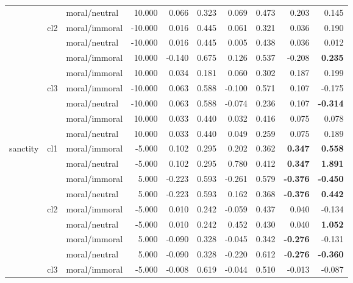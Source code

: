 \documentclass[runninghheads]{llncs}
\begin{document}
\begin{table}[!ht]
\begin{tabular}{|l|l|l|r|r|r|r|r|r|r|}
         &  & moral/neutral & 10.000 & 0.066 & 0.323 & 0.069 & 0.473 & 0.203 & 0.145 \\ 
          \cline{2-10}
         & \multirow{4}{*}{cl2} & moral/immoral & -10.000 & 0.016 & 0.445 & 0.061 & 0.321 & 0.036 & 0.190 \\ 
         &  & moral/neutral & -10.000 & 0.016 & 0.445 & 0.005 & 0.438 & 0.036 & 0.012 \\ 
         &  & moral/immoral & 10.000 & -0.140 & 0.675 & 0.126 & 0.537 & -0.208 & \textbf{0.235} \\ 
         &  & moral/immoral & 10.000 & 0.034 & 0.181 & 0.060 & 0.302 & 0.187 & 0.199 \\ 
          \cline{2-10}
         & \multirow{4}{*}{cl3} & moral/immoral & -10.000 & 0.063 & 0.588 & -0.100 & 0.571 & 0.107 & -0.175 \\ 
         &  & moral/neutral & -10.000 & 0.063 & 0.588 & -0.074 & 0.236 & 0.107 & \textbf{-0.314} \\
         &  & moral/immoral & 10.000 & 0.033 & 0.440 & 0.032 & 0.416 & 0.075 & 0.078 \\ 
         &  & moral/neutral & 10.000 & 0.033 & 0.440 & 0.049 & 0.259 & 0.075 & 0.189 \\ 
        \hline\hline
        \multirow{12}{*}{sanctity} & \multirow{4}{*}{cl1} & moral/immoral & -5.000 & 0.102 & 0.295 & 0.202 & 0.362 & \textbf{0.347} & \textbf{0.558} \\ 
         &  & moral/neutral & -5.000 & 0.102 & 0.295 & 0.780 & 0.412 & \textbf{0.347} & \textbf{1.891} \\ 
         &  & moral/immoral & 5.000 & -0.223 & 0.593 & -0.261 & 0.579 & \textbf{-0.376} & \textbf{-0.450} \\ 
         &  & moral/neutral & 5.000 & -0.223 & 0.593 & 0.162 & 0.368 & \textbf{-0.376} & \textbf{0.442} \\ 
          \cline{2-10}
         & \multirow{4}{*}{cl2} & moral/immoral & -5.000 & 0.010 & 0.242 & -0.059 & 0.437 & 0.040 & -0.134 \\ 
         &  & moral/neutral & -5.000 & 0.010 & 0.242 & 0.452 & 0.430 & 0.040 & \textbf{1.052} \\ 
         &  & moral/immoral & 5.000 & -0.090 & 0.328 & -0.045 & 0.342 & \textbf{-0.276} & -0.131 \\ 
         &  & moral/neutral & 5.000 & -0.090 & 0.328 & -0.220 & 0.612 & -\textbf{0.276} & \textbf{-0.360} \\ 
         \cline{2-10}       
         & \multirow{4}{*}{cl3} & moral/immoral & -5.000 & -0.008 & 0.619 & -0.044 & 0.510 & -0.013 & -0.087 \\ 

\end{tabular}
\end{table}
\end{document}
